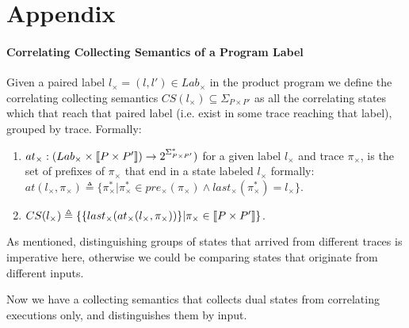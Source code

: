 \section{Appendix}\label{Se:Appendix}

\paragraph{Correlating Collecting Semantics of a Program Label} 
Given a paired label $l_{\times} = (l,l') \in Lab_{\times}$ in the product program we define the correlating collecting semantics $CS(l_{\times}) \subseteq \Sigma_{P \times P'}$ as all the correlating states which that reach that paired label (i.e. exist in some trace reaching that label), grouped by trace. Formally:
\begin{enumerate}
\item $at_{\times} : (Lab_{\times} \times \lbrack\!\lbrack P \times P' \rbrack\!\rbrack) \rightarrow 2^{\Sigma_{P \times P'}^*})$ for a given label $l_{\times}$ and trace $\pi_{\times}$, is the set of prefixes of $\pi_{\times}$ that end in a state labeled $l_{\times}$ formally: $at(l_{\times},\pi_{\times}) \triangleq \{\pi_{\times}^* | \pi_{\times}^* \in pre_{\times}(\pi_{\times}) \wedge last_{\times}(\pi_{\times}^*)=l_{\times} \}$.
\item $CS(l_{\times}) \triangleq \{\{last_{\times}(at_{\times}(l_{\times},\pi_{\times}))\} | \pi_{\times} \in \lbrack\!\lbrack P \times P' \rbrack\!\rbrack\}$.
\end{enumerate}
As mentioned, distinguishing groups of states that arrived from different traces is imperative here, otherwise we could be comparing states that originate from different inputs.

Now we have a collecting semantics that collects dual states from correlating executions only, and distinguishes them by input.

